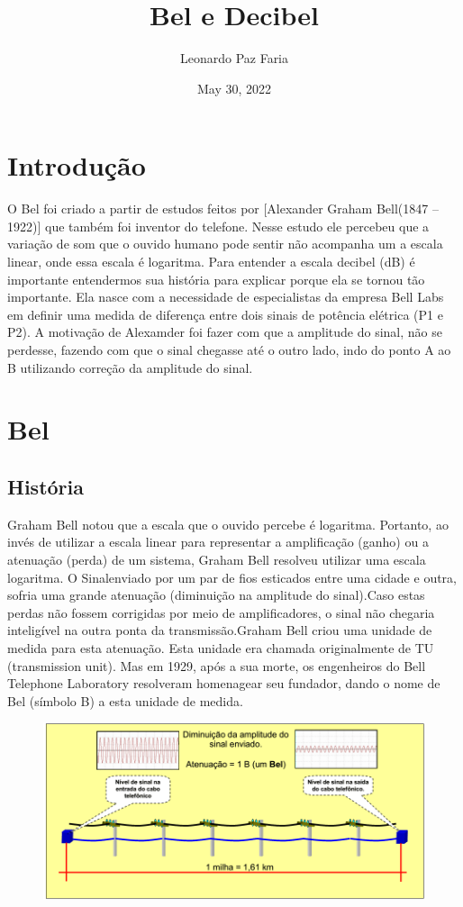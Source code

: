 \documentclass{article}
\title{Bel e Decibel}
\author{Leonardo Paz Faria}
\date{May 30, 2022}
\begin{document}
\maketitle



\section{Introdução}

O Bel foi criado a partir de estudos feitos por [Alexander Graham Bell(1847 – 1922)] que também foi inventor do telefone. Nesse estudo ele percebeu que a variação de som que o ouvido humano pode sentir não acompanha um a escala linear, onde essa escala é logaritma. Para entender a escala decibel (dB) é importante entendermos sua história para explicar porque ela se tornou tão importante. Ela nasce com a necessidade de especialistas da empresa Bell Labs em definir uma medida de diferença entre dois sinais de potência elétrica (P1 e P2). A motivação de Alexamder foi fazer com que a amplitude do sinal, não se perdesse, fazendo com que o sinal chegasse até o outro lado, indo do ponto A ao B utilizando correção da amplitude do sinal.
\section{Bel}

\subsection{História}

Graham Bell notou que a escala que o ouvido percebe é logaritma. Portanto, ao invés de utilizar a escala linear para representar a amplificação (ganho) ou a atenuação (perda) de um sistema, Graham Bell resolveu utilizar uma escala logaritma. O Sinalenviado por um par de fios esticados entre uma cidade e outra, sofria uma grande atenuação (diminuição na amplitude do sinal).Caso estas perdas não fossem corrigidas por meio de amplificadores, o sinal não chegaria inteligível na outra ponta da transmissão.Graham Bell criou uma unidade de medida para esta atenuação. Esta unidade era chamada originalmente de TU (transmission unit). Mas em 1929, após a sua morte, os engenheiros do Bell Telephone Laboratory resolveram homenagear seu fundador, dando o nome de Bel (símbolo B) a esta unidade de medida.

\begin{figure}[h!]
\centering
\includegraphics[width=15cm]{Belimagem.png}
\label{fig:Belimagem}
\end{figure}
\end{document}
